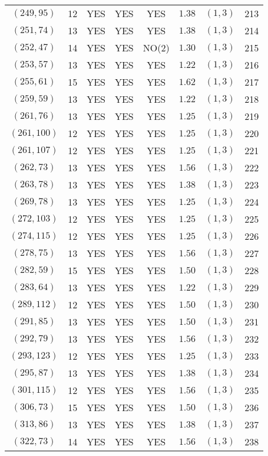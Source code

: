 \begin{longtable}{|c|c|c|c|c|c|c|c|}
$(249,95)$ & 12 & YES & YES & YES & $1.38$ & $(1,3)$ & 213\\
$(251,74)$ & 13 & YES & YES & YES & $1.38$ & $(1,3)$ & 214\\
$(252,47)$ & 14 & YES & YES & NO(2) & $1.30$ & $(1,3)$ & 215\\
$(253,57)$ & 13 & YES & YES & YES & $1.22$ & $(1,3)$ & 216\\
$(255,61)$ & 15 & YES & YES & YES & $1.62$ & $(1,3)$ & 217\\
$(259,59)$ & 13 & YES & YES & YES & $1.22$ & $(1,3)$ & 218\\
$(261,76)$ & 13 & YES & YES & YES & $1.25$ & $(1,3)$ & 219\\
$(261,100)$ & 12 & YES & YES & YES & $1.25$ & $(1,3)$ & 220\\
$(261,107)$ & 12 & YES & YES & YES & $1.25$ & $(1,3)$ & 221\\
$(262,73)$ & 13 & YES & YES & YES & $1.56$ & $(1,3)$ & 222\\
$(263,78)$ & 13 & YES & YES & YES & $1.38$ & $(1,3)$ & 223\\
$(269,78)$ & 13 & YES & YES & YES & $1.25$ & $(1,3)$ & 224\\
$(272,103)$ & 12 & YES & YES & YES & $1.25$ & $(1,3)$ & 225\\
$(274,115)$ & 12 & YES & YES & YES & $1.25$ & $(1,3)$ & 226\\
$(278,75)$ & 13 & YES & YES & YES & $1.56$ & $(1,3)$ & 227\\
$(282,59)$ & 15 & YES & YES & YES & $1.50$ & $(1,3)$ & 228\\
$(283,64)$ & 13 & YES & YES & YES & $1.22$ & $(1,3)$ & 229\\
$(289,112)$ & 12 & YES & YES & YES & $1.50$ & $(1,3)$ & 230\\
$(291,85)$ & 13 & YES & YES & YES & $1.50$ & $(1,3)$ & 231\\
$(292,79)$ & 13 & YES & YES & YES & $1.56$ & $(1,3)$ & 232\\
$(293,123)$ & 12 & YES & YES & YES & $1.25$ & $(1,3)$ & 233\\
$(295,87)$ & 13 & YES & YES & YES & $1.38$ & $(1,3)$ & 234\\
$(301,115)$ & 12 & YES & YES & YES & $1.56$ & $(1,3)$ & 235\\
$(306,73)$ & 15 & YES & YES & YES & $1.50$ & $(1,3)$ & 236\\
$(313,86)$ & 13 & YES & YES & YES & $1.38$ & $(1,3)$ & 237\\
$(322,73)$ & 14 & YES & YES & YES & $1.56$ & $(1,3)$ & 238\\

\end{longtable}
